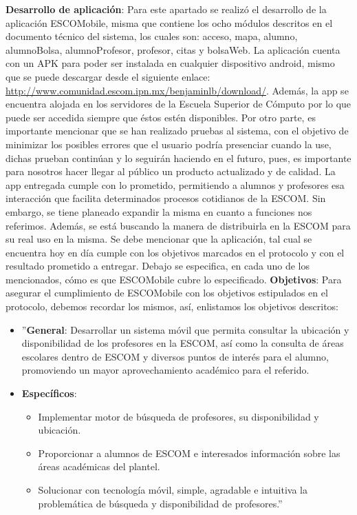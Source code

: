 \newline
\textbf{Desarrollo de aplicación}: Para este apartado se realizó el desarrollo de la aplicación ESCOMobile, misma que contiene los ocho módulos descritos en el documento técnico del sistema, los cuales son: acceso, mapa, alumno, alumnoBolsa, alumnoProfesor, profesor, citas y bolsaWeb. La aplicación cuenta con un APK para poder ser instalada en cualquier dispositivo android, mismo que se puede descargar desde el siguiente enlace: \url{ http://www.comunidad.escom.ipn.mx/benjaminlb/download/}. Además, la app se encuentra alojada en los servidores de la Escuela Superior de Cómputo por lo que puede ser accedida siempre que éstos estén disponibles. Por otro parte, es importante mencionar que se han realizado pruebas al sistema, con el objetivo de minimizar los posibles errores que el usuario podría presenciar cuando la use, dichas prueban continúan y lo seguirán haciendo en el futuro, pues, es importante para nosotros hacer llegar al público un producto actualizado y de calidad. La app entregada cumple con lo prometido, permitiendo a alumnos y profesores esa interacción que facilita determinados procesos cotidianos de la ESCOM. Sin embargo, se tiene planeado expandir la misma en cuanto a funciones nos referimos. Además, se está buscando la manera de distribuirla en la ESCOM para su real uso en la misma.
\newline
\newline
Se debe mencionar que la aplicación, tal cual se encuentra hoy en día cumple con los objetivos marcados en el protocolo y con el resultado prometido a entregar. Debajo se especifica, en cada uno de los mencionados, cómo es que ESCOMobile cubre lo especificado.
\newline
\newline
\textbf{Objetivos}: Para asegurar el cumplimiento de ESCOMobile con los objetivos estipulados en el protocolo, debemos recordar los mismos, así, enlistamos los objetivos descritos: 
\begin{itemize}
	\item ''\textbf{General}: Desarrollar un sistema móvil que permita consultar la ubicación y disponibilidad de los profesores en la ESCOM, así como la consulta de áreas escolares dentro de ESCOM y diversos puntos de interés para el alumno, promoviendo un mayor aprovechamiento académico para el referido. 
	\item \textbf{Específicos}:
	\begin{itemize}
		\item Implementar motor de búsqueda de profesores, su disponibilidad y ubicación. 
		\item Proporcionar a alumnos de ESCOM e interesados información sobre las áreas académicas del plantel.
		\item Solucionar con tecnología móvil, simple, agradable e intuitiva la problemática de búsqueda y disponibilidad de profesores.''  
	\end{itemize}
\end{itemize}
